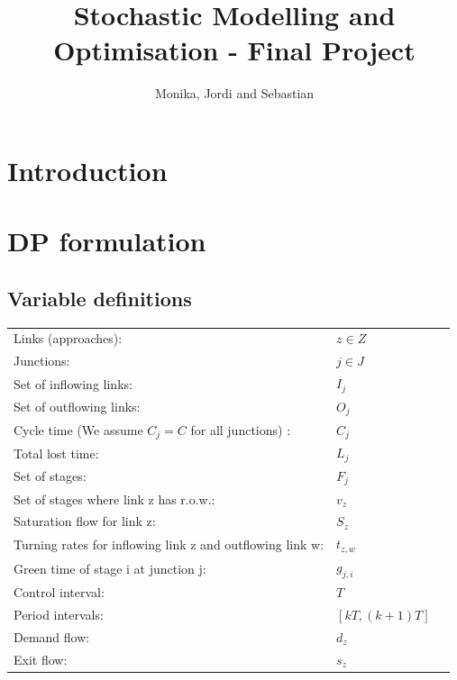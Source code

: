 \documentclass[11pt]{article}
\begin{document}
\author{Monika, Jordi and Sebastian}
\title{Stochastic Modelling and Optimisation - Final Project}
\maketitle

\medskip

\section{Introduction}
\section{DP formulation}
\subsection{Variable definitions}
\begin{tabular}{ l l c }
Links (approaches): & $z \in Z$  &\\
Junctions: & $j \in J$ &\\
Set of inflowing links: & $I_j$ &\\
Set of outflowing links: & $O_j$ &\\
Cycle time (We assume $C_j = C$ for all junctions) : & $C_j$ & \\
Total lost time: &$L_j$ &\\
Set of stages: & $F_j$ &\\
Set of stages where link z has r.o.w.: & $v_z$ &\\
Saturation flow for link z: & $S_z$ &\\
Turning rates for inflowing link z and outflowing link w: & $t_{z,w}$ &\\
Green time of stage i at junction j: & $g_{j,i}$ &\\
Control interval: & $T$ &\\
Period intervals: & $[k T,(k+1) T]$ &\\
Demand flow: & $d_z$ &\\
Exit flow: & $ s_z $ &\\
\end{tabular}
\end{document}
